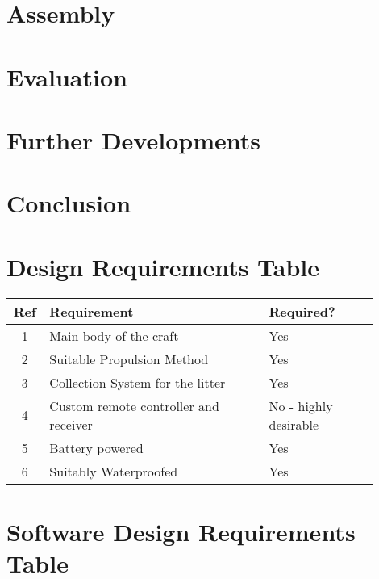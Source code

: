 \documentclass [11pt]{article}
\begin{document}
\section{Assembly}
\section{Evaluation}
\section{Further Developments}
\section{Conclusion}

\newpage




\newpage
\appendix

\section{Design Requirements Table}\label{app:design_requirements_hardware}

\begin{table}[H]
\begin{tabular}{||c||p{0.6\linewidth}|p{0.3\linewidth}||}
\hline
Ref & Requirement                           & Required?             \\
\hline
1   & Main body of the craft                & Yes                   \\
\hline
2   & Suitable Propulsion Method            & Yes                   \\
\hline
3   & Collection System for the litter      & Yes                   \\
\hline
4   & Custom remote controller and receiver & No - highly desirable \\
\hline
5   & Battery powered                       & Yes                   \\
\hline
6   & Suitably Waterproofed                 & Yes\\
\hline              
\end{tabular}
\end{table}

\section{Software Design Requirements Table}\label{app:design_requirements_software}
\end{document}
